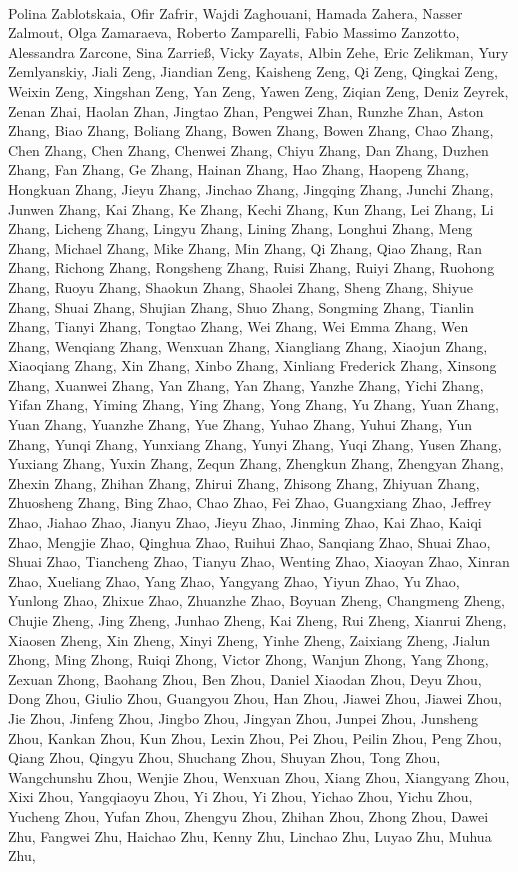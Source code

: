\paragraph{}Polina Zablotskaia, Ofir Zafrir, Wajdi Zaghouani, Hamada Zahera, Nasser Zalmout, Olga Zamaraeva, Roberto Zamparelli, Fabio Massimo Zanzotto, Alessandra Zarcone, Sina Zarrieß, Vicky Zayats, Albin Zehe, Eric Zelikman, Yury Zemlyanskiy, Jiali Zeng, Jiandian Zeng, Kaisheng Zeng, Qi Zeng, Qingkai Zeng, Weixin Zeng, Xingshan Zeng, Yan Zeng, Yawen Zeng, Ziqian Zeng, Deniz Zeyrek, Zenan Zhai, Haolan Zhan, Jingtao Zhan, Pengwei Zhan, Runzhe Zhan, Aston Zhang, Biao Zhang, Boliang Zhang, Bowen Zhang, Bowen Zhang, Chao Zhang, Chen Zhang, Chen Zhang, Chenwei Zhang, Chiyu Zhang, Dan Zhang, Duzhen Zhang, Fan Zhang, Ge Zhang, Hainan Zhang, Hao Zhang, Haopeng Zhang, Hongkuan Zhang, Jieyu Zhang, Jinchao Zhang, Jingqing Zhang, Junchi Zhang, Junwen Zhang, Kai Zhang, Ke Zhang, Kechi Zhang, Kun Zhang, Lei Zhang, Li Zhang, Licheng Zhang, Lingyu Zhang, Lining Zhang, Longhui Zhang, Meng Zhang, Michael Zhang, Mike Zhang, Min Zhang, Qi Zhang, Qiao Zhang, Ran Zhang, Richong Zhang, Rongsheng Zhang, Ruisi Zhang, Ruiyi Zhang, Ruohong Zhang, Ruoyu Zhang, Shaokun Zhang, Shaolei Zhang, Sheng Zhang, Shiyue Zhang, Shuai Zhang, Shujian Zhang, Shuo Zhang, Songming Zhang, Tianlin Zhang, Tianyi Zhang, Tongtao Zhang, Wei Zhang, Wei Emma Zhang, Wen Zhang, Wenqiang Zhang, Wenxuan Zhang, Xiangliang Zhang, Xiaojun Zhang, Xiaoqiang Zhang, Xin Zhang, Xinbo Zhang, Xinliang Frederick Zhang, Xinsong Zhang, Xuanwei Zhang, Yan Zhang, Yan Zhang, Yanzhe Zhang, Yichi Zhang, Yifan Zhang, Yiming Zhang, Ying Zhang, Yong Zhang, Yu Zhang, Yuan Zhang, Yuan Zhang, Yuanzhe Zhang, Yue Zhang, Yuhao Zhang, Yuhui Zhang, Yun Zhang, Yunqi Zhang, Yunxiang Zhang, Yunyi Zhang, Yuqi Zhang, Yusen Zhang, Yuxiang Zhang, Yuxin Zhang, Zequn Zhang, Zhengkun Zhang, Zhengyan Zhang, Zhexin Zhang, Zhihan Zhang, Zhirui Zhang, Zhisong Zhang, Zhiyuan Zhang, Zhuosheng Zhang, Bing Zhao, Chao Zhao, Fei Zhao, Guangxiang Zhao, Jeffrey Zhao, Jiahao Zhao, Jianyu Zhao, Jieyu Zhao, Jinming Zhao, Kai Zhao, Kaiqi Zhao, Mengjie Zhao, Qinghua Zhao, Ruihui Zhao, Sanqiang Zhao, Shuai Zhao, Shuai Zhao, Tiancheng Zhao, Tianyu Zhao, Wenting Zhao, Xiaoyan Zhao, Xinran Zhao, Xueliang Zhao, Yang Zhao, Yangyang Zhao, Yiyun Zhao, Yu Zhao, Yunlong Zhao, Zhixue Zhao, Zhuanzhe Zhao, Boyuan Zheng, Changmeng Zheng, Chujie Zheng, Jing Zheng, Junhao Zheng, Kai Zheng, Rui Zheng, Xianrui Zheng, Xiaosen Zheng, Xin Zheng, Xinyi Zheng, Yinhe Zheng, Zaixiang Zheng, Jialun Zhong, Ming Zhong, Ruiqi Zhong, Victor Zhong, Wanjun Zhong, Yang Zhong, Zexuan Zhong, Baohang Zhou, Ben Zhou, Daniel Xiaodan Zhou, Deyu Zhou, Dong Zhou, Giulio Zhou, Guangyou Zhou, Han Zhou, Jiawei Zhou, Jiawei Zhou, Jie Zhou, Jinfeng Zhou, Jingbo Zhou, Jingyan Zhou, Junpei Zhou, Junsheng Zhou, Kankan Zhou, Kun Zhou, Lexin Zhou, Pei Zhou, Peilin Zhou, Peng Zhou, Qiang Zhou, Qingyu Zhou, Shuchang Zhou, Shuyan Zhou, Tong Zhou, Wangchunshu Zhou, Wenjie Zhou, Wenxuan Zhou, Xiang Zhou, Xiangyang Zhou, Xixi Zhou, Yangqiaoyu Zhou, Yi Zhou, Yi Zhou, Yichao Zhou, Yichu Zhou, Yucheng Zhou, Yufan Zhou, Zhengyu Zhou, Zhihan Zhou, Zhong Zhou, Dawei Zhu, Fangwei Zhu, Haichao Zhu, Kenny Zhu, Linchao Zhu, Luyao Zhu, Muhua Zhu, 